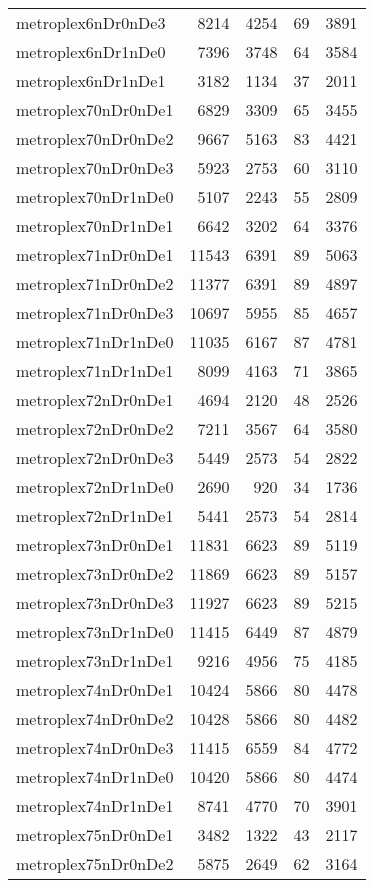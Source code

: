 \begin{longtable}{lrrrr}
metroplex6nDr0nDe3 & 8214 & 4254 & 69 & 3891 \\
metroplex6nDr1nDe0 & 7396 & 3748 & 64 & 3584 \\
metroplex6nDr1nDe1 & 3182 & 1134 & 37 & 2011 \\
metroplex70nDr0nDe1 & 6829 & 3309 & 65 & 3455 \\
metroplex70nDr0nDe2 & 9667 & 5163 & 83 & 4421 \\
metroplex70nDr0nDe3 & 5923 & 2753 & 60 & 3110 \\
metroplex70nDr1nDe0 & 5107 & 2243 & 55 & 2809 \\
metroplex70nDr1nDe1 & 6642 & 3202 & 64 & 3376 \\
metroplex71nDr0nDe1 & 11543 & 6391 & 89 & 5063 \\
metroplex71nDr0nDe2 & 11377 & 6391 & 89 & 4897 \\
metroplex71nDr0nDe3 & 10697 & 5955 & 85 & 4657 \\
metroplex71nDr1nDe0 & 11035 & 6167 & 87 & 4781 \\
metroplex71nDr1nDe1 & 8099 & 4163 & 71 & 3865 \\
metroplex72nDr0nDe1 & 4694 & 2120 & 48 & 2526 \\
metroplex72nDr0nDe2 & 7211 & 3567 & 64 & 3580 \\
metroplex72nDr0nDe3 & 5449 & 2573 & 54 & 2822 \\
metroplex72nDr1nDe0 & 2690 & 920 & 34 & 1736 \\
metroplex72nDr1nDe1 & 5441 & 2573 & 54 & 2814 \\
metroplex73nDr0nDe1 & 11831 & 6623 & 89 & 5119 \\
metroplex73nDr0nDe2 & 11869 & 6623 & 89 & 5157 \\
metroplex73nDr0nDe3 & 11927 & 6623 & 89 & 5215 \\
metroplex73nDr1nDe0 & 11415 & 6449 & 87 & 4879 \\
metroplex73nDr1nDe1 & 9216 & 4956 & 75 & 4185 \\
metroplex74nDr0nDe1 & 10424 & 5866 & 80 & 4478 \\
metroplex74nDr0nDe2 & 10428 & 5866 & 80 & 4482 \\
metroplex74nDr0nDe3 & 11415 & 6559 & 84 & 4772 \\
metroplex74nDr1nDe0 & 10420 & 5866 & 80 & 4474 \\
metroplex74nDr1nDe1 & 8741 & 4770 & 70 & 3901 \\
metroplex75nDr0nDe1 & 3482 & 1322 & 43 & 2117 \\
metroplex75nDr0nDe2 & 5875 & 2649 & 62 & 3164 \\

\end{longtable}
